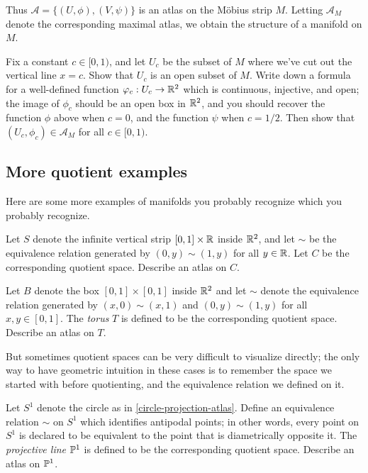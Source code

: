 Thus $\mathscr{A} = \{(U, \phi), (V, \psi)\}$ is an atlas on the M\"obius strip $M$. Letting $\mathscr{A}_M$ denote the corresponding maximal atlas, we obtain the structure of a manifold on $M$.

\begin{exercise}
	Fix a constant $c \in [0,1)$, and let $U_c$ be the subset of $M$ where we've cut out the vertical line $x = c$. Show that $U_c$ is an open subset of $M$. Write down a formula for a well-defined function $\varphi_c : U_c \to \mathbb{R}^2$ which is continuous, injective, and open; the image of $\phi_c$ should be an open box in $\mathbb{R}^2$, and you should recover the function $\phi$ above when $c = 0$, and the function $\psi$ when $c = 1/2$. Then show that $(U_c, \phi_c) \in \mathscr{A}_M$ for all $c \in [0,1)$. 
\end{exercise}

\subsection{More quotient examples}

Here are some more examples of manifolds you probably recognize which you probably recognize. 

\begin{exercise}[Cylinder] \label{cylinder}
	Let $S$ denote the infinite vertical strip $[0,1] \times \mathbb{R}$ inside $\mathbb{R}^2$, and let $\sim$ be the equivalence relation generated by $(0,y) \sim (1,y)$ for all $y \in \mathbb{R}$. Let $C$ be the corresponding quotient space. Describe an atlas on $C$. 
\end{exercise}

\begin{exercise}[Torus] \label{torus} 
	Let $B$ denote the box $[0,1] \times [0,1]$ inside $\mathbb{R}^2$ and let $\sim$ denote the equivalence relation generated by $(x,0) \sim (x,1)$ and $(0,y) \sim (1,y)$ for all $x,y \in [0,1]$. The \emph{torus} $T$ is defined to be the corresponding quotient space. Describe an atlas on $T$. 
\end{exercise}


But sometimes quotient spaces can be very difficult to visualize directly; the only way to have geometric intuition in these cases is to remember the space we started with before quotienting, and the equivalence relation we defined on it. 

\begin{exercise} \label{rp1}  
	Let $S^1$ denote the circle as in \cref{circle-projection-atlas}. Define an equivalence relation $\sim$ on $S^1$ which identifies antipodal points; in other words, every point on $S^1$ is declared to be equivalent to the point that is diametrically opposite it. The \emph{projective line} $\mathbb{P}^1$ is defined to be the corresponding quotient space. Describe an atlas on $\mathbb{P}^1$. 
\end{exercise}

